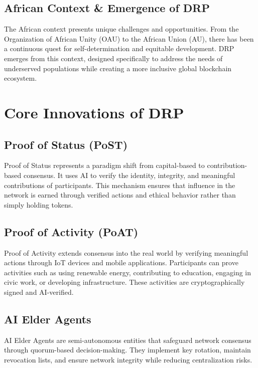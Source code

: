 \documentclass[11pt,a4paper]{article}
\begin{document}
\subsection{African Context \& Emergence of DRP}
The African context presents unique challenges and opportunities. From the Organization of African Unity (OAU) to the African Union (AU), there has been a continuous quest for self-determination and equitable development. DRP emerges from this context, designed specifically to address the needs of underserved populations while creating a more inclusive global blockchain ecosystem.


\section{Core Innovations of DRP}

\subsection{Proof of Status (PoST)}
Proof of Status represents a paradigm shift from capital-based to contribution-based consensus. It uses AI to verify the identity, integrity, and meaningful contributions of participants. This mechanism ensures that influence in the network is earned through verified actions and ethical behavior rather than simply holding tokens.

\subsection{Proof of Activity (PoAT)}
Proof of Activity extends consensus into the real world by verifying meaningful actions through IoT devices and mobile applications. Participants can prove activities such as using renewable energy, contributing to education, engaging in civic work, or developing infrastructure. These activities are cryptographically signed and AI-verified.

\subsection{AI Elder Agents}
AI Elder Agents are semi-autonomous entities that safeguard network consensus through quorum-based decision-making. They implement key rotation, maintain revocation lists, and ensure network integrity while reducing centralization risks.
\end{document}

